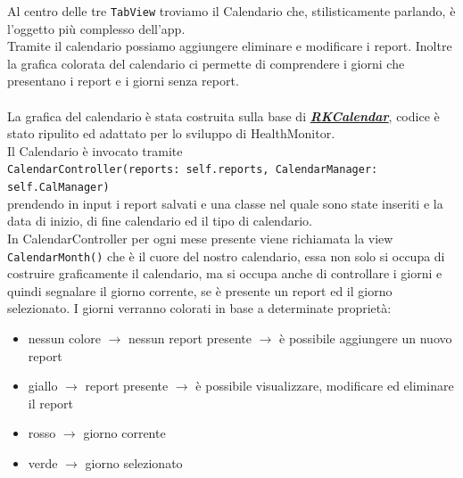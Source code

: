 \documentclass{article}
\begin{document}
Al centro delle tre \texttt{TabView} troviamo il Calendario che, stilisticamente parlando, è l'oggetto più complesso dell'app.\\
Tramite il calendario possiamo aggiungere eliminare e modificare i report. Inoltre la grafica colorata del calendario ci permette di comprendere i giorni che presentano i report e i giorni senza report. \\
\\
La grafica del calendario è stata costruita sulla base di \textbf{\textit{\href{https://github.com/RaffiKian/RKCalendar}{RKCalendar}}}, codice è stato ripulito ed adattato per lo sviluppo di HealthMonitor.\\
Il Calendario è invocato tramite \\
\texttt{CalendarController(reports: self.reports, CalendarManager: self.CalManager)} \\
prendendo in input i report salvati e una classe nel quale sono state inseriti e la data di inizio, di fine calendario ed il tipo di calendario.\\
In CalendarController per ogni mese presente viene richiamata la view \texttt{CalendarMonth()} che è il cuore del nostro calendario, essa non solo si occupa di costruire graficamente il calendario, ma si occupa anche di controllare i giorni e quindi segnalare il giorno corrente, se è presente un report ed il giorno selezionato. I giorni verranno colorati in base a determinate proprietà:
\begin{itemize}
  \item nessun colore $\rightarrow$ nessun report presente $\rightarrow$ è possibile aggiungere un nuovo report
  \item giallo $\rightarrow$ report presente $\rightarrow$ è possibile visualizzare, modificare ed eliminare il report
  \item rosso $\rightarrow$ giorno corrente 
  \item verde $\rightarrow$ giorno selezionato
\end{itemize}
\end{document}
